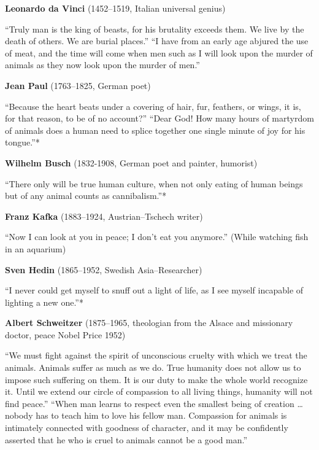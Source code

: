 \documentclass[../main.tex]{subfiles}
\begin{document}
\vspace{5mm}
\noindent \textbf{Leonardo da Vinci} (1452--1519, Italian universal genius)

\noindent ``Truly man is the king of beasts, for his brutality exceeds them.
We live by the death of others. We are burial places.''
``I have from an early age abjured the use of meat, and the time will come when men such as I will look upon the murder of animals as they now look upon the murder of men.''

\vspace{5mm}
\noindent \textbf{Jean Paul} (1763--1825, German poet)

\noindent ``Because the heart beats under a covering of hair, fur, feathers, or wings, it is, for that reason, to be of no account?''
``Dear God! How many hours of martyrdom of animals does a human need to splice together one single minute of joy for his tongue.''*

\vspace{5mm}
\noindent \textbf{Wilhelm Busch} (1832-1908, German poet and painter, humorist)

\noindent ``There only will be true human culture, when not only eating of human beings but of any animal counts as cannibalism.''*

\vspace{5mm}
\noindent \textbf{Franz Kafka} (1883--1924, Austrian--Tschech writer)

\noindent ``Now I can look at you in peace; I don't eat you anymore.''
(While watching fish in an aquarium)

\vspace{5mm}
\noindent \textbf{Sven Hedin} (1865--1952, Swedish Asia--Researcher)

\noindent ``I never could get myself to snuff out a light of life, as I see myself incapable of lighting a new one.''*

\vspace{5mm}
\noindent \textbf{Albert Schweitzer} (1875--1965, theologian from the Alsace and missionary doctor, peace Nobel Price 1952)

\noindent ``We must fight against the spirit of unconscious cruelty with which we treat the animals. Animals suffer as much as we do. True humanity does not allow us to impose such suffering on them. It is our duty to make the whole world recognize it. Until we extend our circle of compassion to all living things, humanity will not find peace.''
``When man learns to respect even the smallest being of creation \ldots nobody has to teach him to love his fellow man. Compassion for animals is intimately connected with goodness of character, and it may be confidently asserted that he who is cruel to animals cannot be a good man.''
\end{document}
